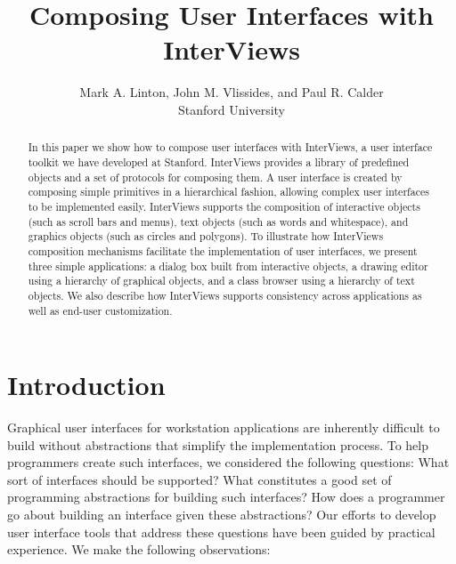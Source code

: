 
\title{Composing User Interfaces with InterViews}
\author{
    Mark A. Linton, John M. Vlissides, and Paul R. Calder \\
    Stanford University
}


\maketitle
\thispagestyle{empty}

\begin{abstract}
In this paper we show how to compose user interfaces with InterViews, a user
interface toolkit we have developed at Stanford.  InterViews provides a
library of predefined objects and a set of protocols for composing
them.  A user interface is created by composing simple primitives in a
hierarchical fashion, allowing complex user interfaces to be implemented
easily.  InterViews supports the composition of interactive objects (such as
scroll bars and menus), text objects (such as words and whitespace),
and graphics objects (such as circles and polygons).  To illustrate how
InterViews composition mechanisms facilitate the implementation of
user interfaces, we present three simple applications: a dialog box built from
interactive objects, a drawing editor using a hierarchy of graphical objects,
and a class browser using a hierarchy of text objects.  We also describe how
InterViews supports consistency across applications as well as end-user
customization.
\end{abstract}

\section{Introduction}
Graphical user interfaces for workstation applications are inherently
difficult to build without abstractions that simplify the
implementation process.  To help programmers create such interfaces,
we considered the following questions: What sort of interfaces should
be supported?  What constitutes a good set of programming abstractions
for building such interfaces?  How does a programmer go about building
an interface given these abstractions?  Our efforts to develop user
interface tools that address these questions have been guided by
practical experience.  We make the following observations:


